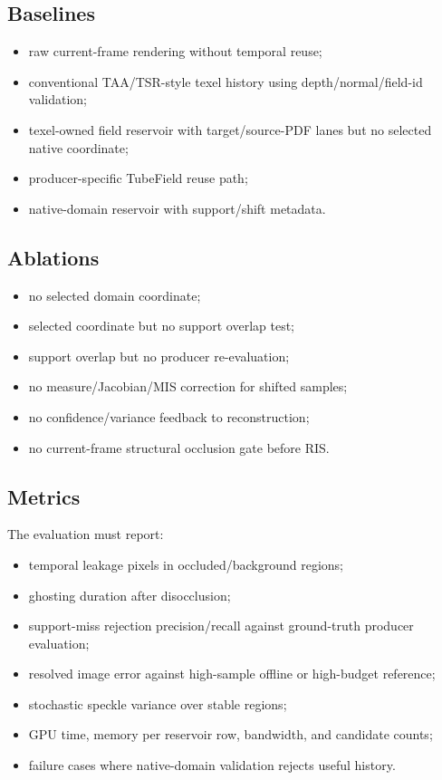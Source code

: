 \documentclass[11pt]{article}
\begin{document}
\subsection{Baselines}

\begin{itemize}[leftmargin=1.5em]
  \item raw current-frame rendering without temporal reuse;
  \item conventional TAA/TSR-style texel history using depth/normal/field-id
  validation;
  \item texel-owned field reservoir with target/source-PDF lanes but no
  selected native coordinate;
  \item producer-specific TubeField reuse path;
  \item native-domain reservoir with support/shift metadata.
\end{itemize}

\subsection{Ablations}

\begin{itemize}[leftmargin=1.5em]
  \item no selected domain coordinate;
  \item selected coordinate but no support overlap test;
  \item support overlap but no producer re-evaluation;
  \item no measure/Jacobian/MIS correction for shifted samples;
  \item no confidence/variance feedback to reconstruction;
  \item no current-frame structural occlusion gate before RIS.
\end{itemize}

\subsection{Metrics}

The evaluation must report:

\begin{itemize}[leftmargin=1.5em]
  \item temporal leakage pixels in occluded/background regions;
  \item ghosting duration after disocclusion;
  \item support-miss rejection precision/recall against ground-truth producer
  evaluation;
  \item resolved image error against high-sample offline or high-budget
  reference;
  \item stochastic speckle variance over stable regions;
  \item GPU time, memory per reservoir row, bandwidth, and candidate counts;
  \item failure cases where native-domain validation rejects useful history.
\end{itemize}
\end{document}
